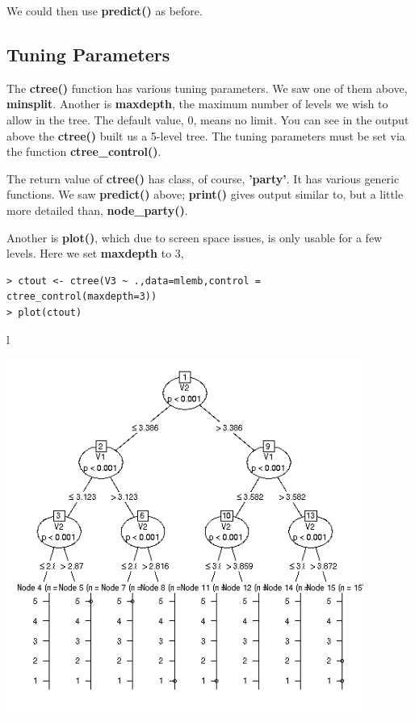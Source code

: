 We could then use \textbf{predict()} as before.

\subsection{Tuning Parameters}

The \textbf{ctree()} function has various tuning parameters.  We saw one
of them above, \textbf{minsplit}.  Another is \textbf{maxdepth}, the
maximum number of levels we wish to allow in the tree.   The default
value, 0, means no limit.  You can see in the output above the
\textbf{ctree()} built us a 5-level tree.  The tuning parameters must be
set via the function \textbf{ctree\_control()}.

The return value of \textbf{ctree()} has class, of course,
\textbf{'party'}.  It has various generic functions.  We saw
\textbf{predict()} above; \textbf{print()} gives output similar to, but
a little more detailed than, \textbf{node\_party()}.  

Another is \textbf{plot()}, which due to screen space issues, is only
usable for a few levels.  Here we set \textbf{maxdepth} to 3,

\begin{lstlisting}
> ctout <- ctree(V3 ~ .,data=mlemb,control = ctree_control(maxdepth=3))
> plot(ctout)
\end{lstlisting}l

\includegraphics[width=4.6in]{Images/MLmaxdepth3.png}

